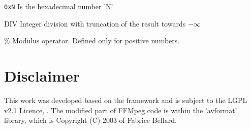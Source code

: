 \documentclass[
	12pt,				%
	openright,			%
	twoside,			%
	a4paper,			%
	brazil,
	french,				%
	english
	]{abntex2}
\begin{document}
\listoffigures*
\cleardoublepage

\listoftables*
\cleardoublepage





\begin{simbolos}
  \item[\texttt{0xN}] Is the hexadecimal number 'N'
  \item[DIV] Integer division with truncation of the result towards $-\infty$
  \item[\%] Modulus operator. Defined only for positive numbers.
\end{simbolos}

\tableofcontents*
\cleardoublepage



\textual

\chapter*[Disclaimer]{Disclaimer}

This work was developed based on the \cite{ffmpeg} framework and is subject to the LGPL v2.1 Licence, \cite{gplv2}. The modified part of FFMpeg code is within the 'avformat' library, which is Copyright (C) 2003 of Fabrice Bellard. 
\end{document}
